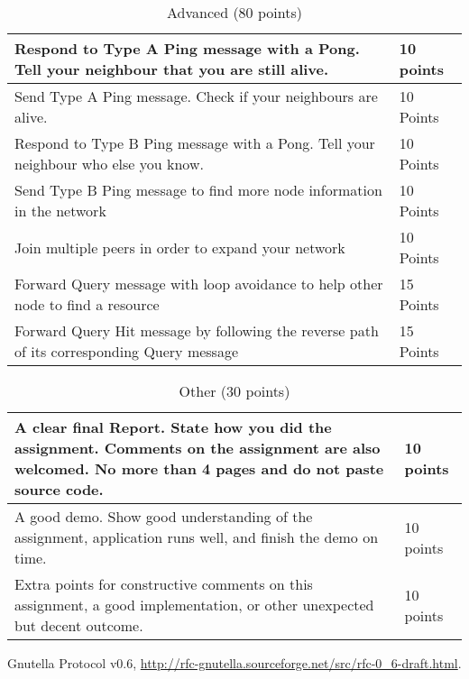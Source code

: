 \documentclass[12pt, a4paper]{article}
\begin{document}
\begin{table}[htdp]
\caption{Advanced (80 points)}
\begin{center}
\begin{tabular}{|p{11cm}|p{2cm}|}
\hline
Respond to Type A Ping message with a Pong.
Tell your neighbour that you are still alive. & 10 points \\
\hline
Send Type A Ping message.
Check if your neighbours are alive. & 10 Points \\
\hline
Respond to Type B Ping message with a Pong.
Tell your neighbour who else you know. & 10 Points \\
\hline
Send Type B Ping message to find more node information in the network & 10 Points \\
\hline
Join multiple peers in order to expand your network & 10 Points \\
\hline
Forward Query message with loop avoidance to help other node to find a resource & 15 Points \\
\hline
Forward Query Hit message by following the reverse path of its corresponding Query message & 15 Points \\
\hline
\end{tabular}
\end{center}
\end{table}

\begin{table}[htdp]
\caption{Other (30 points)}
\begin{center}
\begin{tabular}{|p{11cm}|p{2cm}|}
\hline
A clear final Report.
State how you did the assignment.
Comments on the assignment are also welcomed.
No more than 4 pages and do not paste source code. & 10 points \\
\hline
A good demo.
Show good understanding of the assignment, application runs well, and finish the demo on time. & 10 points \\
\hline
Extra points for constructive comments on this assignment, a good implementation, or other unexpected but decent outcome. & 10 points \\

\hline
\end{tabular}
\end{center}
\end{table}


\FloatBarrier

\begin{thebibliography}{1}

Gnutella Protocol v0.6, \url{http://rfc-gnutella.sourceforge.net/src/rfc-0\_6-draft.html}.

\end{thebibliography}
\end{document}
